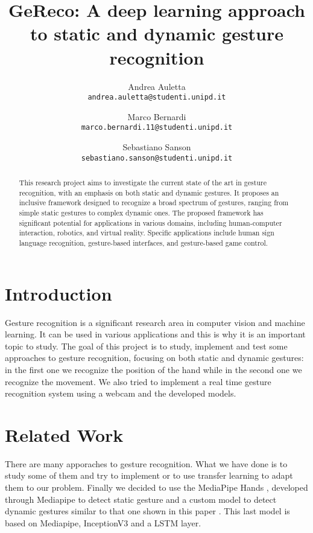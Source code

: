 \documentclass[10pt,twocolumn,letterpaper]{article}
\begin{document}
\title{GeReco: A deep learning approach to static and dynamic gesture recognition}

\author{Andrea Auletta\\
{\tt\small andrea.auletta@studenti.unipd.it}
\and
Marco Bernardi\\
{\tt\small marco.bernardi.11@studenti.unipd.it}
\and
Sebastiano Sanson\\
{\tt\small sebastiano.sanson@studenti.unipd.it}
}

\maketitle

\begin{abstract}
   This research project aims to investigate the current state of the art in gesture recognition, with an emphasis on both static and dynamic gestures. 
   It proposes an inclusive framework designed to recognize a broad spectrum of gestures, ranging from simple static gestures to complex dynamic ones. 
   The proposed framework has significant potential for applications in various domains, including human-computer interaction, robotics, and virtual reality. 
   Specific applications include human sign language recognition, gesture-based interfaces, and gesture-based game control.
\end{abstract}


\section{Introduction}
Gesture recognition is a significant research area in computer vision and machine learning. It can be used in various applications and this is why it is an important topic to study.
The goal of this project is to study, implement and test some approaches to gesture recognition, focusing on both static and dynamic gestures: in the first one we recognize the position of 
the hand while in the second one we recognize the movement. 
We also tried to implement a real time gesture recognition system using a webcam and the developed models.
\section{Related Work}
There are many apporaches to gesture recognition. What we have done is to study some of them and try to implement or to use transfer learning to adapt them to our problem.
Finally we decided to use the MediaPipe Hands \cite{zhang2020mediapipehandsondevicerealtime}, developed through Mediapipe \cite{lugaresi2019mediapipeframeworkbuildingperception} 
to detect static gesture and a custom model to detect dynamic gestures similar to that one shown in this paper \cite{electronics13163233}. 
This last model is based on Mediapipe, InceptionV3 and a LSTM layer.
\end{document}
